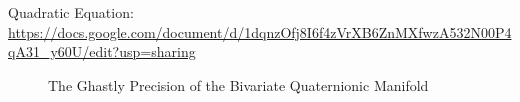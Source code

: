 \documentclass[preprint,13pt]{elsarticle}
\begin{document}
Quadratic Equation:\\
\url{https://docs.google.com/document/d/1dqnzOfj8I6f4zVrXB6ZnMXfwzA532N00P4qA31_y60U/edit?usp=sharing}
\begin{figure}[bp!]
\begin{center}
\caption{The Ghastly Precision of the Bivariate Quaternionic Manifold}
\noindent{}
\end{center}
\end{figure}
\end{document}
